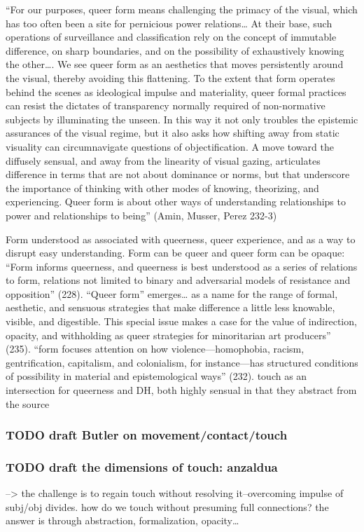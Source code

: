 \documentclass[11pt]{article}
\begin{document}
“For our purposes, queer form means challenging the primacy of the
visual, which has too often been a site for pernicious power
relations… At their base, such operations of surveillance and
classification rely on the concept of immutable difference, on sharp
boundaries, and on the possibility of exhaustively knowing the
other…. We see queer form as an aesthetics that moves persistently
around the visual, thereby avoiding this flattening. To the extent
that form operates behind the scenes as ideological impulse and
materiality, queer formal practices can resist the dictates of
transparency normally required of non-normative subjects by
illuminating the unseen. In this way it not only troubles the
epistemic assurances of the visual regime, but it also asks how
shifting away from static visuality can circumnavigate questions of
objectification. A move toward the diffusely sensual, and away from
the linearity of visual gazing, articulates difference in terms that
are not about dominance or norms, but that underscore the importance
of thinking with other modes of knowing, theorizing, and
experiencing. Queer form is about other ways of understanding
relationships to power and relationships to being” (Amin, Musser,
Perez 232-3)

Form understood as associated with queerness, queer experience, and as a way to disrupt easy understanding. Form can be queer and queer form can be opaque: 
“Form informs queerness, and queerness is best understood as a series of relations to form, relations not limited to binary and adversarial models of resistance and opposition” (228).
“Queer form” emerges… as a name for the range of formal, aesthetic, and sensuous strategies that make difference a little less knowable, visible, and digestible. This special issue makes a case for the value of indirection, opacity, and withholding as queer strategies for minoritarian art producers” (235).
 “form focuses attention on how violence—homophobia, racism, gentrification, capitalism, and colonialism, for instance—has structured conditions of possibility in material and epistemological ways” (232).
touch as an intersection for queerness and DH, both highly sensual
in that they abstract from the source

\subsubsection{{\bfseries\sffamily TODO} draft Butler on movement/contact/touch}
\label{sec:orgbde1bae}
\subsubsection{{\bfseries\sffamily TODO} draft the dimensions of touch: anzaldua}
\label{sec:orgdfeaae2}
--> the challenge is to regain touch without resolving it--overcoming
impulse of subj/obj divides. how do we touch without presuming full
connections? the answer is through abstraction, formalization,
opacity\ldots{}
\end{document}
